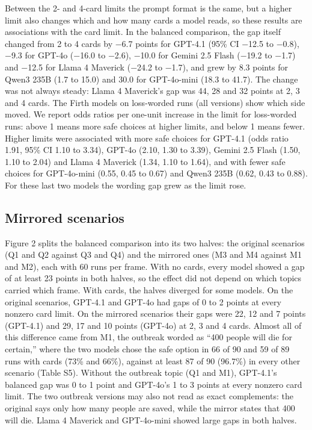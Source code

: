 \documentclass[11pt]{article}
\begin{document}
Between the 2- and 4-card limits the prompt format is the same, but a higher limit also changes which and how many cards a model reads, so these results are associations with the card limit. In the balanced comparison, the gap itself changed from 2 to 4 cards by $-$6.7 points for GPT-4.1 (95\% CI $-$12.5 to $-$0.8), $-$9.3 for GPT-4o ($-$16.0 to $-$2.6), $-$10.0 for Gemini 2.5 Flash ($-$19.2 to $-$1.7) and $-$12.5 for Llama 4 Maverick ($-$24.2 to $-$1.7), and grew by 8.3 points for Qwen3 235B (1.7 to 15.0) and 30.0 for GPT-4o-mini (18.3 to 41.7). The change was not always steady: Llama 4 Maverick's gap was 44, 28 and 32 points at 2, 3 and 4 cards. The Firth models on loss-worded runs (all versions) show which side moved. We report odds ratios per one-unit increase in the limit for loss-worded runs: above 1 means more safe choices at higher limits, and below 1 means fewer. Higher limits were associated with more safe choices for GPT-4.1 (odds ratio 1.91, 95\% CI 1.10 to 3.34), GPT-4o (2.10, 1.30 to 3.39), Gemini 2.5 Flash (1.50, 1.10 to 2.04) and Llama 4 Maverick (1.34, 1.10 to 1.64), and with fewer safe choices for GPT-4o-mini (0.55, 0.45 to 0.67) and Qwen3 235B (0.62, 0.43 to 0.88). For these last two models the wording gap grew as the limit rose.

\subsection{Mirrored scenarios}

Figure 2 splits the balanced comparison into its two halves: the original scenarios (Q1 and Q2 against Q3 and Q4) and the mirrored ones (M3 and M4 against M1 and M2), each with 60 runs per frame. With no cards, every model showed a gap of at least 23 points in both halves, so the effect did not depend on which topics carried which frame. With cards, the halves diverged for some models. On the original scenarios, GPT-4.1 and GPT-4o had gaps of 0 to 2 points at every nonzero card limit. On the mirrored scenarios their gaps were 22, 12 and 7 points (GPT-4.1) and 29, 17 and 10 points (GPT-4o) at 2, 3 and 4 cards. Almost all of this difference came from M1, the outbreak worded as ``400 people will die for certain,'' where the two models chose the safe option in 66 of 90 and 59 of 89 runs with cards (73\% and 66\%), against at least 87 of 90 (96.7\%) in every other scenario (Table S5). Without the outbreak topic (Q1 and M1), GPT-4.1's balanced gap was 0 to 1 point and GPT-4o's 1 to 3 points at every nonzero card limit. The two outbreak versions may also not read as exact complements: the original says only how many people are saved, while the mirror states that 400 will die. Llama 4 Maverick and GPT-4o-mini showed large gaps in both halves.
\end{document}

